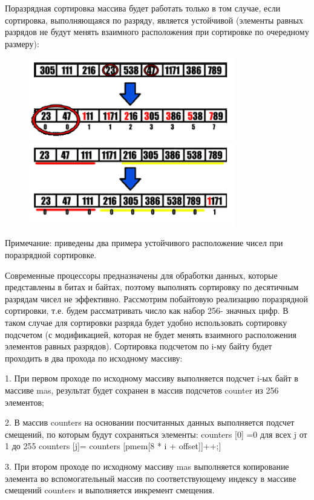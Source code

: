 \documentclass{report}
\begin{document}
Поразрядная сортировка массива будет работать только в том случае, если
сортировка, выполняющаяся по разряду, является устойчивой (элементы равных разрядов не будут менять взаимного расположения при сортировке по очередному размеру): 


\begin{figure}[htp]
    \includegraphics[width=9cm]{image6}
    \includegraphics[width=9cm]{image7}
    \label{fig:galaxy}
\end{figure}
Примечание: приведены два примера устойчивого расположение чисел при поразрядной сортировке.

\newpage

Современные процессоры предназначены для обработки данных, которые
представлены в битах и байтах, поэтому выполнять сортировку по десятичным
разрядам чисел не эффективно. Рассмотрим побайтовую реализацию
поразрядной сортировки, т.е. будем рассматривать число как набор 256-
значных цифр. В таком случае для сортировки разряда будет удобно
использовать сортировку подсчетом (с модификацией, которая не будет
менять взаимного расположения элементов равных разрядов).
Сортировка подсчетом по i-му байту будет проходить в два прохода по
исходному массиву:

1.	При первом проходе по исходному массиву выполняется подсчет
i-ых байт в массиве mas, результат будет сохранен в массив подсчетов
counter из 256 элементов;

2.	В массив counters на основании посчитанных данных выполняется
подсчет смещений, по которым будут сохраняться элементы:
counters [0] =0 для всех j от 1 до 255 counters [j]= counters [pmem[8 * i + offset]]++;]

3.	При втором проходе по исходному массиву mas выполняется
копирование элемента во вспомогательный массив по соответствующему индексу в массиве смещений counters и выполняется
инкремент смещения.
\end{document}
